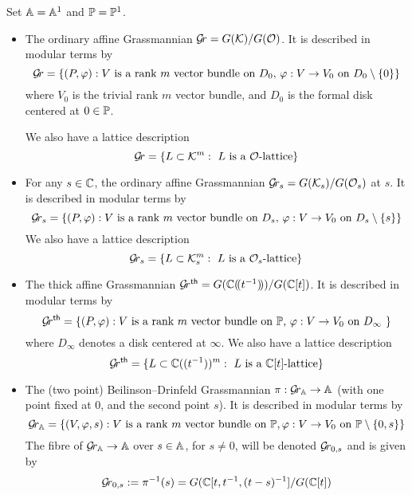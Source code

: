 \documentclass{article}
\begin{document}
Set $\AA = \AA^1$ and $\PP = \PP^1$. 

\begin{itemize}
    \item The ordinary affine Grassmannian $\Gr = G(\cK)/G(\cO)$. It is described in modular terms by 
    $$
    \Gr = \{ (P, \varphi) : \text{$V$ is a rank $m$ vector bundle on $ D_0 $, $\varphi : V \rightarrow V_0 $ on $ D_0 \setminus \{0\} $} \} 
    $$
    where $V_0$ is the trivial rank $m$ vector bundle, and $ D_0$ is the formal disk centered at $ 0 \in \PP$.
    
    We also have a lattice description 
    $$ 
    \Gr = \{ L \subset \cK^m : \text{ $L$ is a $\cO$-lattice} \}
    $$
    \item For any $ s \in \CC $, the ordinary affine Grassmannian $\Gr_s = G(\cK_s)/G(\cO_s)$ at $ s $. It is described in modular terms by
    $$
    \Gr_s = \{ (P, \varphi) : \text{$V$ is a rank $m$ vector bundle on $ D_s $, $\varphi : V \rightarrow V_0 $ on $ D_s \setminus \{s\} $} \} 
    $$
    We also have a lattice description 
    $$ \Gr_s = \{ L \subset \cK_s^m : \text{ $L$ is a $\cO_s$-lattice} \}
$$   
    \item The thick affine Grassmannian $\Gr^{\sf th} = G(\CC\xT[t^{-1}])/G(\CC[t])$. It is described in modular terms by
    $$
        \Grth = \{ (P, \varphi) : \text{$V$ is a rank $m$ vector bundle on $ \PP $, $\varphi : V \rightarrow V_0 $ on $ D_\infty $ } \} %
    $$
    where $D_\infty$ denotes a disk centered at $ \infty$.
    We also have a lattice description 
$$ 
\Gr^{\sf th} = \{ L \subset  \CC((t^{-1}))^m : \text{ $L$ is a $\CC[t]$-lattice} \}
$$   

    \item The (two point) Beilinson--Drinfeld Grassmannian $\pi : \Grbd\to \AA$ (with one point fixed at 0, and the second point $s$).
    It is described in modular terms by
    {\small
    $$
    \Grbd = 
        \left\{ 
            (V,\varphi,s) : V\text{ is a rank $m$ vector bundle on }\PP, \varphi : V \rightarrow V_0 \text{ on } \PP \setminus \{0, s\}  
        \right\} 
    $$}
    The fibre of $\Grbd \to \AA$ over $ s \in \AA $, for $ s \ne 0$, will be denoted $ \Gr_{0,s} $ and is given by
    $$ \Gr_{0,s} := \pi^{-1}(s) = G(\CC[t, t^{-1}, (t-s)^{-1}]/G(\CC[t])$$
    

\end{itemize}
\end{document}
